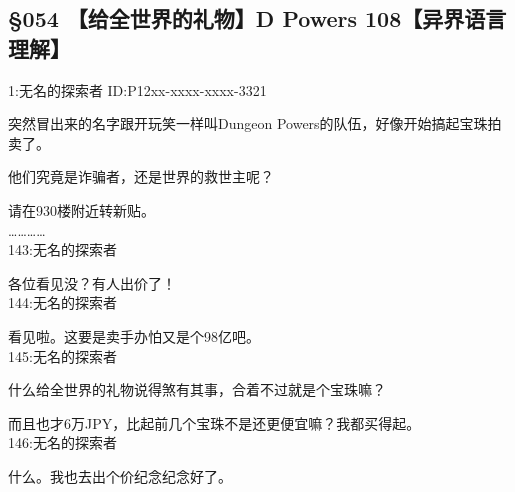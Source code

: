 \subsection{§054 【给全世界的礼物】D Powers 108【异界语言理解】}

1:无名的探索者 ID:P12xx-xxxx-xxxx-3321

突然冒出来的名字跟开玩笑一样叫Dungeon Powers的队伍，好像开始搞起宝珠拍卖了。

他们究竟是诈骗者，还是世界的救世主呢？

请在930楼附近转新贴。\\

…………\\

143:无名的探索者

各位看见没？有人出价了！\\

144:无名的探索者

看见啦。这要是卖手办怕又是个98亿吧。\\

145:无名的探索者

什么给全世界的礼物说得煞有其事，合着不过就是个宝珠嘛？

而且也才6万JPY，比起前几个宝珠不是还更便宜嘛？我都买得起。\\

146:无名的探索者

什么。我也去出个价纪念纪念好了。\\

